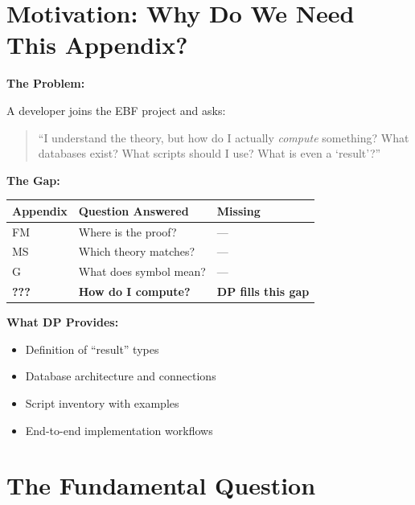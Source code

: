 \section{Motivation: Why Do We Need This Appendix?}
\label{sec:dp-motivation}

\begin{tcolorbox}[colback=orange!5!white, colframe=orange!75!black,
    title=\textbf{Motivation: The Developer's Dilemma}]

\textbf{The Problem:}

A developer joins the EBF project and asks:
\begin{quote}
``I understand the theory, but how do I actually \textit{compute} something?
What databases exist? What scripts should I use? What is even a `result'?''
\end{quote}

\textbf{The Gap:}

\begin{center}
\begin{tabular}{|l|l|l|}
\hline
\textbf{Appendix} & \textbf{Question Answered} & \textbf{Missing} \\
\hline
\hline
FM & Where is the proof? & --- \\
MS & Which theory matches? & --- \\
G & What does symbol mean? & --- \\
\textbf{???} & \textbf{How do I compute?} & \textbf{DP fills this gap} \\
\hline
\end{tabular}
\end{center}

\textbf{What DP Provides:}
\begin{itemize}[nosep]
    \item Definition of ``result'' types
    \item Database architecture and connections
    \item Script inventory with examples
    \item End-to-end implementation workflows
\end{itemize}

\end{tcolorbox}

\section{The Fundamental Question}
\label{sec:dp-fundamental}

